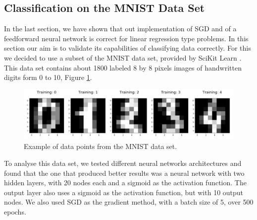 \documentclass[aps,reprint,superscriptaddress,nofootinbib]{revtex4-2}
\begin{document}
\subsection*{Classification on the MNIST Data Set}

In the last section, we have shown that out implementation of SGD and of a feedforward neural network is correct for linear regression type problems. In this section our aim is to validate its capabilities of classifying data correctly. For this we decided to use a subset of the MNIST data set, provided by SciKit Learn \cite{mnistsklearn}. This data set contains about 1800 labeled 8 by 8 pixels images of handwritten digits form 0 to 10, Figure \ref{fig:mnist_data_set}.


\begin{figure}[h]
    \centering
    \includegraphics[width=\linewidth]{a.png}
    \caption{Example of data points from the MNIST data set.}
    \label{fig:mnist_data_set}
\end{figure}

To analyse this data set, we tested different neural networks architectures and found that the one that produced better results was a neural network with two hidden layers, with 20 nodes each and a sigmoid as the activation function. The output layer also uses a sigmoid as the activation function, but with 10 output nodes. We also used SGD as the gradient method, with a batch size of 5, over 500 epochs. 
\end{document}
